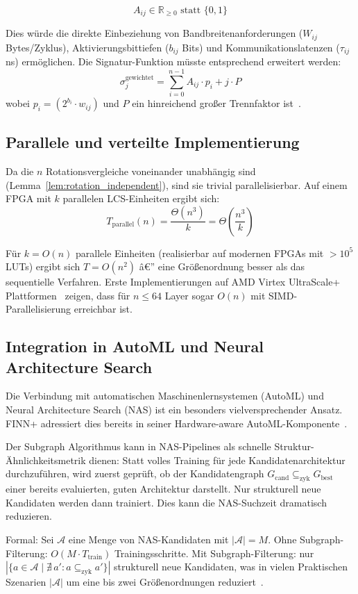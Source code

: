 ﻿\documentclass[a4paper,12pt]{article}
\theoremstyle{definition}
\begin{document}
\[
    A_{ij} \in \mathbb{R}_{\geq 0} \text{ statt } \{0,1\}
\]

Dies würde die direkte Einbeziehung von Bandbreitenanforderungen ($W_{ij}$ Bytes/Zyklus),
Aktivierungsbittiefen ($b_{ij}$ Bits) und Kommunikationslatenzen ($\tau_{ij}$ ns) ermöglichen.
Die Signatur-Funktion müsste entsprechend erweitert werden:
\[
    \sigma_j^{\text{gewichtet}} = \sum_{i=0}^{n-1} A_{ij} \cdot p_i + j \cdot P
\]
wobei $p_i = (2^{b_i} \cdot w_{ij})$ und $P$ ein hinreichend großer Trennfaktor ist~\cite{epp2026a}.

\subsection{Parallele und verteilte Implementierung}

Da die $n$ Rotationsvergleiche voneinander unabhängig sind (Lemma~\ref{lem:rotation_independent}),
sind sie trivial parallelisierbar. Auf einem FPGA mit $k$ parallelen LCS-Einheiten ergibt sich:
\[
    T_{\text{parallel}}(n) = \frac{\Theta(n^3)}{k} = \Theta\!\left(\frac{n^3}{k}\right)
\]

Für $k = O(n)$ parallele Einheiten (realisierbar auf modernen FPGAs mit $>10^5$ LUTs)
ergibt sich $T = O(n^2)$ â€” eine Größenordnung besser als das sequentielle Verfahren.
Erste Implementierungen auf AMD Virtex UltraScale+ Plattformen~\cite{jentzsch2025} zeigen,
dass für $n \leq 64$ Layer sogar $O(n)$ mit SIMD-Parallelisierung erreichbar ist.

\subsection{Integration in AutoML und Neural Architecture Search}

Die Verbindung mit automatischen Maschinenlernsystemen (AutoML) und Neural Architecture
Search (NAS) ist ein besonders vielversprechender Ansatz. FINN+ adressiert dies bereits
in seiner Hardware-aware AutoML-Komponente~\cite{jentzsch2025}.

Der Subgraph Algorithmus kann in NAS-Pipelines als schnelle Struktur-Ähnlichkeitsmetrik
dienen: Statt volles Training für jede Kandidatenarchitektur durchzuführen, wird zuerst
geprüft, ob der Kandidatengraph $G_{\text{cand}} \subseteq_{\text{zyk}} G_{\text{best}}$
einer bereits evaluierten, guten Architektur darstellt. Nur strukturell neue Kandidaten
werden dann trainiert. Dies kann die NAS-Suchzeit dramatisch reduzieren.

Formal: Sei $\mathcal{A}$ eine Menge von NAS-Kandidaten mit $|\mathcal{A}| = M$.
Ohne Subgraph-Filterung: $O(M \cdot T_{\text{train}})$ Trainingsschritte.
Mit Subgraph-Filterung: nur $|\{a \in \mathcal{A} \mid \nexists\, a' : a \subseteq_{\text{zyk}} a'\}|$
strukturell neue Kandidaten, was in vielen Praktischen Szenarien $|\mathcal{A}|$
um eine bis zwei Größenordnungen reduziert~\cite{zoph2016}.
\end{document}
